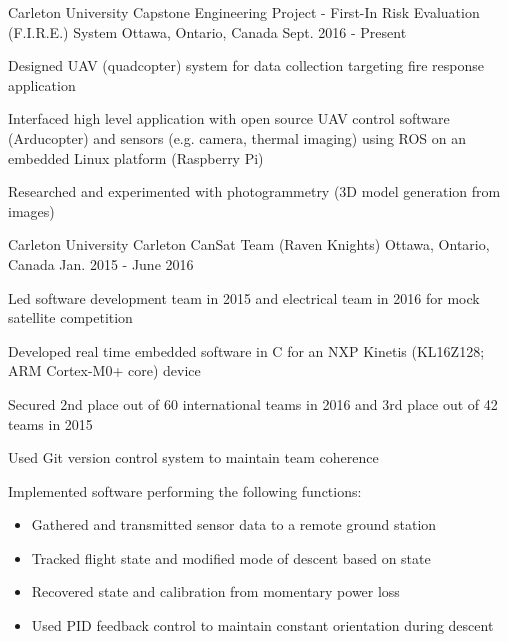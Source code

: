 

\begin{cventries}

  \cventry
    {Carleton University} %
    {Capstone Engineering Project - First-In Risk Evaluation (F.I.R.E.) System} %
    {Ottawa, Ontario, Canada} %
    {Sept. 2016 - Present} %
    {
      \begin{cvitems} %
        \item {Designed UAV (quadcopter) system for data collection targeting fire response application}
        \item {Interfaced high level application with open source UAV control software (Arducopter) and sensors (e.g. camera, thermal imaging) using ROS on an embedded Linux platform (Raspberry Pi)}
        \item {Researched and experimented with photogrammetry (3D model generation from images)}
      \end{cvitems}
    }

  \cventry
    {Carleton University} %
    {Carleton CanSat Team (Raven Knights)} %
    {Ottawa, Ontario, Canada} %
    {Jan. 2015 - June 2016} %
    {
      \begin{cvitems} %
        \item {Led software development team in 2015 and electrical team in 2016 for mock satellite competition}
        \item {Developed real time embedded software in C for an NXP Kinetis (KL16Z128; ARM Cortex-M0+ core) device}
        \item {Secured 2nd place out of 60 international teams in 2016 and 3rd place out of 42 teams in 2015}
        \item {Used Git version control system to maintain team coherence}
        \item {Implemented software performing the following functions:}
        \begin{itemize}
          \item {Gathered and transmitted sensor data to a remote ground station}
          \item {Tracked flight state and modified mode of descent based on state}
          \item {Recovered state and calibration from momentary power loss}
          \item {Used PID feedback control to maintain constant orientation during descent}
        \end{itemize}
      \end{cvitems}
    }


\end{cventries}
